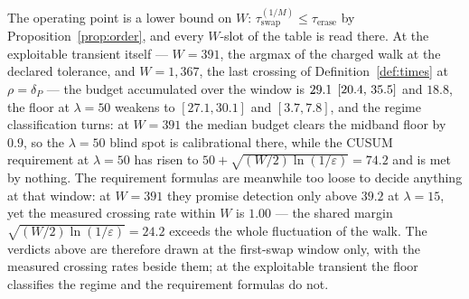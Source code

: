 \begin{remark}
  The operating point is a lower bound on $W$:
  $\tau_{\mathrm{swap}}^{(1/M)} \le \tau_{\mathrm{erase}}$ by
  Proposition~\ref{prop:order}, and every $W$-slot of the table is read
  there. At the exploitable transient itself --- $W = 391$, the argmax of the
  charged walk at the declared tolerance, and $W = 1{,}367$, the last crossing
  of Definition~\ref{def:times} at $\rho = \delta_P$ --- the budget
  accumulated over the window is $29.1$ $[20.4,\,35.5]$ and $18.8$, the floor
  at $\lambda = 50$ weakens to $[27.1, 30.1]$ and $[3.7, 7.8]$, and the
  regime classification turns: at $W = 391$ the median budget clears the
  midband floor by $0.9$, so the $\lambda = 50$ blind spot is calibrational
  there, while the CUSUM requirement at $\lambda = 50$ has risen to
  $50 + \sqrt{(W/2)\ln(1/\varepsilon)} = 74.2$ and is met by nothing. The
  requirement formulas are meanwhile too loose to decide anything at that
  window: at $W = 391$ they promise detection only above $39.2$ at
  $\lambda = 15$, yet the measured crossing rate within $W$ is $1.00$ ---
  the shared margin $\sqrt{(W/2)\ln(1/\varepsilon)} = 24.2$ exceeds the whole
  fluctuation of the walk. The verdicts above are therefore drawn at the
  first-swap window only, with the measured crossing rates beside them; at
  the exploitable transient the floor classifies the regime and the
  requirement formulas do not.
\end{remark}